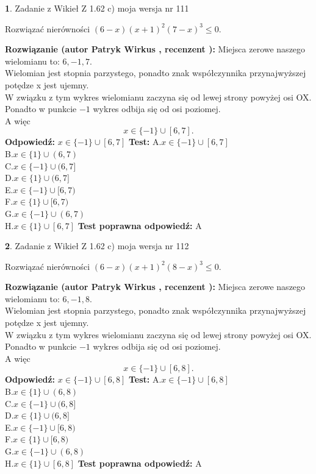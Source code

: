 \documentclass[12pt, a4paper]{article}
\theoremstyle{definition} %
\newtheorem{zad}{}
\newcommand{\zadStart}[1]{\begin{zad}#1\newline}
\newcommand{\zadStop}{\end{zad}}
\newcommand{\rozwStart}[2]{\noindent \textbf{Rozwiązanie (autor #1 , recenzent #2): }\newline}
\newcommand{\rozwStop}{\newline}
\newcommand{\odpStart}{\noindent \textbf{Odpowiedź:}\newline}
\newcommand{\odpStop}{\newline}
\newcommand{\testStart}{\noindent \textbf{Test:}\newline}
\newcommand{\testStop}{\newline}
\newcommand{\kluczStart}{\noindent \textbf{Test poprawna odpowiedź:}\newline}
\newcommand{\kluczStop}{\newline}
\begin{document}
\zadStart{Zadanie z Wikieł Z 1.62 c) moja wersja nr 111}

Rozwiązać nierówności $(6-x)(x+1)^{2}(7-x)^{3}\le0$.
\zadStop
\rozwStart{Patryk Wirkus}{}
Miejsca zerowe naszego wielomianu to: $6, -1, 7$.\\
Wielomian jest stopnia parzystego, ponadto znak współczynnika przy\linebreak najwyższej potędze x jest ujemny.\\ W związku z tym wykres wielomianu zaczyna się od lewej strony powyżej osi OX.\\
Ponadto w punkcie $-1$ wykres odbija się od osi poziomej.\\
A więc $$x \in \{-1\} \cup [6,7].$$
\rozwStop
\odpStart
$x \in \{-1\} \cup [6,7]$
\odpStop
\testStart
A.$x \in \{-1\} \cup [6,7]$\\
B.$x \in \{1\} \cup (6,7)$\\
C.$x \in \{-1\} \cup (6,7]$\\
D.$x \in \{1\} \cup (6,7]$\\
E.$x \in \{-1\} \cup [6,7)$\\
F.$x \in \{1\} \cup [6,7)$\\
G.$x \in \{-1\} \cup (6,7)$\\
H.$x \in \{1\} \cup [6,7]$
\testStop
\kluczStart
A
\kluczStop



\zadStart{Zadanie z Wikieł Z 1.62 c) moja wersja nr 112}

Rozwiązać nierówności $(6-x)(x+1)^{2}(8-x)^{3}\le0$.
\zadStop
\rozwStart{Patryk Wirkus}{}
Miejsca zerowe naszego wielomianu to: $6, -1, 8$.\\
Wielomian jest stopnia parzystego, ponadto znak współczynnika przy\linebreak najwyższej potędze x jest ujemny.\\ W związku z tym wykres wielomianu zaczyna się od lewej strony powyżej osi OX.\\
Ponadto w punkcie $-1$ wykres odbija się od osi poziomej.\\
A więc $$x \in \{-1\} \cup [6,8].$$
\rozwStop
\odpStart
$x \in \{-1\} \cup [6,8]$
\odpStop
\testStart
A.$x \in \{-1\} \cup [6,8]$\\
B.$x \in \{1\} \cup (6,8)$\\
C.$x \in \{-1\} \cup (6,8]$\\
D.$x \in \{1\} \cup (6,8]$\\
E.$x \in \{-1\} \cup [6,8)$\\
F.$x \in \{1\} \cup [6,8)$\\
G.$x \in \{-1\} \cup (6,8)$\\
H.$x \in \{1\} \cup [6,8]$
\testStop
\kluczStart
A
\kluczStop
\end{document}
